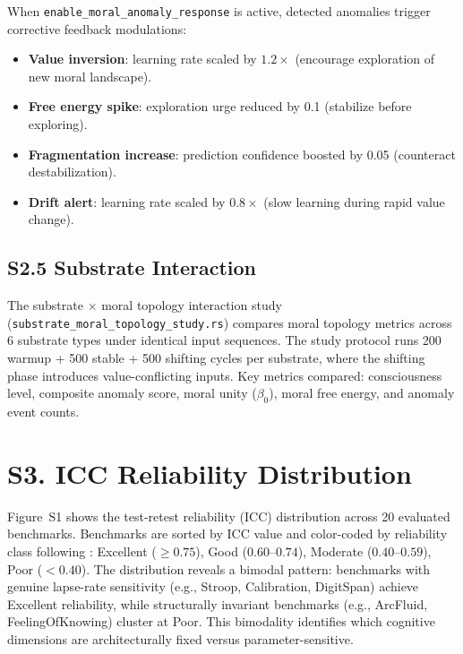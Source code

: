 \documentclass[10pt,landscape]{article}
\begin{document}
When \texttt{enable\_moral\_anomaly\_response} is active, detected anomalies trigger corrective feedback modulations:

\begin{itemize}
  \item \textbf{Value inversion}: learning rate scaled by $1.2\times$ (encourage exploration of new moral landscape).
  \item \textbf{Free energy spike}: exploration urge reduced by 0.1 (stabilize before exploring).
  \item \textbf{Fragmentation increase}: prediction confidence boosted by 0.05 (counteract destabilization).
  \item \textbf{Drift alert}: learning rate scaled by $0.8\times$ (slow learning during rapid value change).
\end{itemize}

\subsection*{S2.5 Substrate Interaction}

The substrate $\times$ moral topology interaction study (\texttt{substrate\_moral\_topology\_study.rs}) compares moral topology metrics across 6 substrate types under identical input sequences.  The study protocol runs 200 warmup + 500 stable + 500 shifting cycles per substrate, where the shifting phase introduces value-conflicting inputs.  Key metrics compared: consciousness level, composite anomaly score, moral unity ($\beta_0$), moral free energy, and anomaly event counts.

\clearpage
\section*{S3. ICC Reliability Distribution}

Figure~S1 shows the test-retest reliability (ICC) distribution across 20 evaluated benchmarks. Benchmarks are sorted by ICC value and color-coded by reliability class following \citet{cicchetti1994guidelines}: Excellent ($\geq 0.75$), Good ($0.60$--$0.74$), Moderate ($0.40$--$0.59$), Poor ($< 0.40$). The distribution reveals a bimodal pattern: benchmarks with genuine lapse-rate sensitivity (e.g., Stroop, Calibration, DigitSpan) achieve Excellent reliability, while structurally invariant benchmarks (e.g., ArcFluid, FeelingOfKnowing) cluster at Poor. This bimodality identifies which cognitive dimensions are architecturally fixed versus parameter-sensitive.
\end{document}

